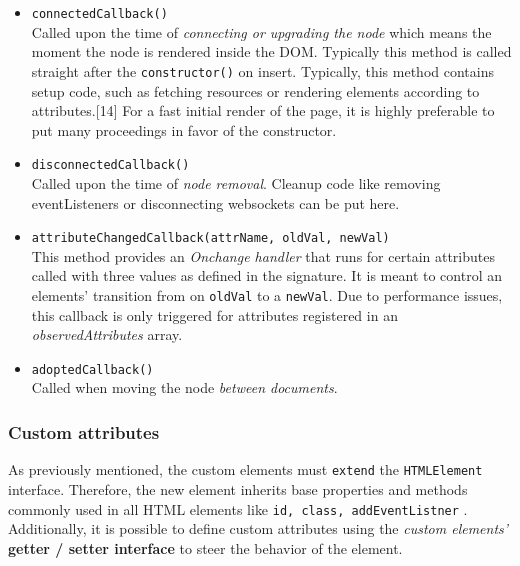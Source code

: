 \documentclass[]{article}
\providecommand{\tightlist}{%
  \setlength{\itemsep}{0pt}\setlength{\parskip}{0pt}}
\begin{document}
\begin{itemize}
\tightlist
\item
  \texttt{connectedCallback()}\\
  Called upon the time of \emph{connecting or upgrading the node} which
  means the moment the node is rendered inside the DOM. Typically this
  method is called straight after the \texttt{constructor()} on insert.
  Typically, this method contains setup code, such as fetching resources
  or rendering elements according to attributes.{[}14{]} For a fast
  initial render of the page, it is highly preferable to put many
  proceedings in favor of the constructor.
\item
  \texttt{disconnectedCallback()}\\
  Called upon the time of \emph{node removal}. Cleanup code like
  removing eventListeners or disconnecting websockets can be put here.
\item
  \texttt{attributeChangedCallback(attrName,\ oldVal,\ newVal)}\\
  This method provides an \emph{Onchange handler} that runs for certain
  attributes called with three values as defined in the signature. It is
  meant to control an elements' transition from on \texttt{oldVal} to a
  \texttt{newVal}. Due to performance issues, this callback is only
  triggered for attributes registered in an \emph{observedAttributes}
  array.
\item
  \texttt{adoptedCallback()}\\
  Called when moving the node \emph{between documents}.
\end{itemize}

\subsubsection{Custom attributes}\label{custom-attributes}

As previously mentioned, the custom elements must \texttt{extend} the
\texttt{HTMLElement} interface. Therefore, the new element inherits base
properties and methods commonly used in all HTML elements like
\texttt{id,\ class,\ addEventListner} . Additionally, it is possible to
define custom attributes using the \emph{custom elements'}
\textbf{getter / setter interface} to steer the behavior of the element.
\end{document}
